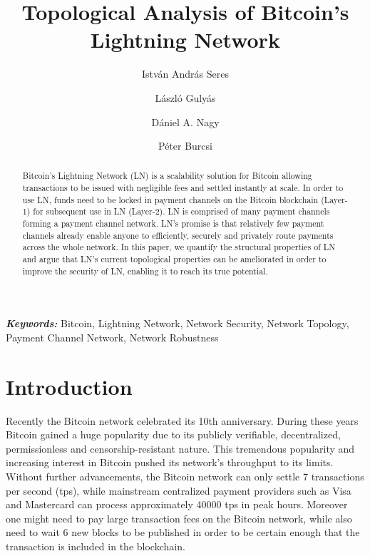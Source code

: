 \documentclass[a4paper]{article}
\title{Topological Analysis of Bitcoin's Lightning Network }
\author[1]{István András Seres}
\author[1]{László Gulyás}
\author[1]{Dániel A. Nagy}
\author[1]{Péter Burcsi}
\affil[1]{Department of Computer Algebra, Eötvös Loránd University}
\theoremstyle{definition}
\providecommand{\keywords}[1]{\textbf{\textit{Keywords:}} #1}
\begin{document}
\maketitle

\begin{abstract}
Bitcoin's Lightning Network (LN) is a scalability solution for Bitcoin allowing transactions to be issued with negligible fees and settled instantly at scale. In order to use LN, funds need to be locked in payment channels on the Bitcoin blockchain (Layer-1) for subsequent use in LN (Layer-2). LN is comprised of many payment channels forming a payment channel network. LN's promise is that relatively few payment channels already enable anyone to efficiently, securely and privately route payments across the whole network. In this paper, we quantify the structural properties of LN and argue that LN's current topological properties can be ameliorated in order to improve the security of LN, enabling it to reach its true potential.  
\end{abstract}
\keywords{Bitcoin, Lightning Network, Network Security, Network Topology, Payment Channel Network, Network Robustness}

\section{Introduction}
Recently the Bitcoin \cite{nakamoto2008bitcoin} network celebrated its 10th anniversary. During these years Bitcoin gained a huge popularity due to its publicly verifiable, decentralized, permissionless and censorship-resistant nature. This tremendous popularity and increasing interest in Bitcoin pushed its network's throughput to its limits. Without further advancements, the Bitcoin network can only settle $7$ transactions per second (tps), while mainstream centralized payment providers such as Visa and Mastercard can process approximately \num[group-separator={,}]{40000} tps in peak hours. Moreover one might need to pay large transaction fees on the Bitcoin network, while also need to wait 6 new blocks to be published in order to be certain enough that the transaction is included in the blockchain.
\end{document}
